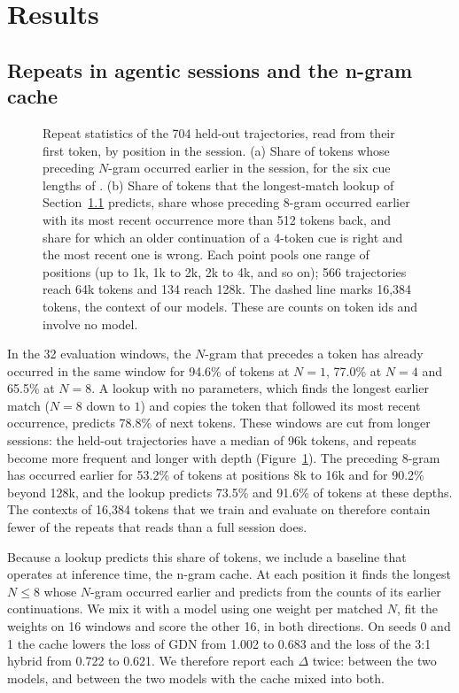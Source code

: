 \section{Results}
\label{sec:results}

\subsection{Repeats in agentic sessions and the n-gram cache}
\label{sec:repeats}

\begin{figure}[tb]
\centering

\caption{Repeat statistics of the 704 held-out trajectories, read from their first token, by
position in the session. (a) Share of tokens whose preceding $N$-gram occurred earlier in the
session, for the six cue lengths of \ingram{}. (b) Share of tokens that the longest-match lookup
of Section~\ref{sec:repeats} predicts, share whose preceding 8-gram occurred earlier with its most
recent occurrence more than 512 tokens back, and share for which an older continuation of a 4-token
cue is right and the most recent one is wrong. Each point pools one range of positions (up to 1k,
1k to 2k, 2k to 4k, and so on); 566 trajectories reach 64k tokens and 134 reach 128k. The dashed
line marks 16,384 tokens, the context of our models. These are counts on token ids and involve no
model.}
\label{fig:repeats}
\end{figure}

In the 32 evaluation windows, the $N$-gram that precedes a token has already occurred in the same
window for 94.6\% of tokens at $N = 1$, 77.0\% at $N = 4$ and 65.5\% at $N = 8$. A lookup with no
parameters, which finds the longest earlier match ($N = 8$ down to $1$) and copies the token that
followed its most recent occurrence, predicts 78.8\% of next tokens. These windows are cut from
longer sessions: the held-out trajectories have a median of 96k tokens, and repeats become more
frequent and longer with depth (Figure~\ref{fig:repeats}). The preceding 8-gram has occurred
earlier for 53.2\% of tokens at positions 8k to 16k and for 90.2\% beyond 128k, and the lookup
predicts 73.5\% and 91.6\% of tokens at these depths. The contexts of 16,384 tokens that we train
and evaluate on therefore contain fewer of the repeats that \ingram{} reads than a full session
does.

Because a lookup predicts this share of tokens, we include a baseline that operates at inference
time, the n-gram cache. At each position it finds the longest $N \le 8$ whose $N$-gram occurred
earlier and predicts from the counts of its earlier continuations. We mix it with a model using
one weight per matched $N$, fit the weights on 16 windows and score the other 16, in both
directions. On seeds 0 and 1 the cache lowers the loss of GDN from 1.002 to 0.683 and the loss of
the 3:1 hybrid from 0.722 to 0.621. We therefore report each $\Delta$ twice: between the two
models, and between the two models with the cache mixed into both.

